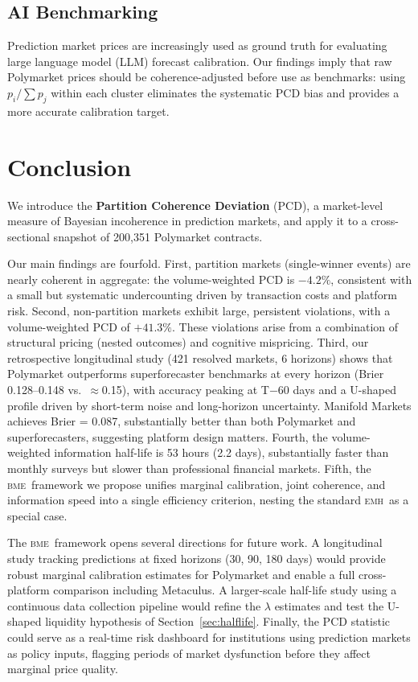 \documentclass[12pt,a4paper]{article}
\theoremstyle{definition}
\theoremstyle{remark}
\newcommand{\PCD}{\mathrm{PCD}}
\newcommand{\EMH}{\textsc{emh}}
\newcommand{\BME}{\textsc{bme}}
\begin{document}
\subsection{AI Benchmarking}

Prediction market prices are increasingly used as ground truth for evaluating
large language model (LLM) forecast calibration.
Our findings imply that raw Polymarket prices should be coherence-adjusted
before use as benchmarks: using $p_i / \sum p_j$ within each cluster
eliminates the systematic $\PCD$ bias and provides a more accurate
calibration target.

\section{Conclusion}
\label{sec:conclusion}

We introduce the \textbf{Partition Coherence Deviation} ($\PCD$), a
market-level measure of Bayesian incoherence in prediction markets, and
apply it to a cross-sectional snapshot of 200{,}351 Polymarket contracts.

Our main findings are fourfold.
First, partition markets (single-winner events) are nearly coherent in
aggregate: the volume-weighted $\PCD$ is $-4.2\%$, consistent with a
small but systematic undercounting driven by transaction costs and platform
risk.
Second, non-partition markets exhibit large, persistent violations,
with a volume-weighted $\PCD$ of $+41.3\%$.
These violations arise from a combination of structural pricing (nested
outcomes) and cognitive mispricing.
Third, our retrospective longitudinal study (421 resolved markets, 6 horizons)
shows that Polymarket outperforms superforecaster benchmarks at every horizon
(Brier 0.128--0.148 vs.\ $\approx$0.15), with accuracy peaking at T$-$60 days
and a U-shaped profile driven by short-term noise and long-horizon uncertainty.
Manifold Markets achieves Brier = 0.087, substantially better than both
Polymarket and superforecasters, suggesting platform design matters.
Fourth, the volume-weighted information half-life is 53 hours (2.2 days),
substantially faster than monthly surveys but slower than professional
financial markets.
Fifth, the \BME\ framework we propose unifies marginal calibration,
joint coherence, and information speed into a single efficiency criterion,
nesting the standard \EMH\ as a special case.

The \BME\ framework opens several directions for future work.
A longitudinal study tracking predictions at fixed horizons (30, 90, 180
days) would provide robust marginal calibration estimates for Polymarket
and enable a full cross-platform comparison including Metaculus.
A larger-scale half-life study using a continuous data collection pipeline
would refine the $\lambda$ estimates and test the U-shaped liquidity
hypothesis of Section~\ref{sec:halflife}.
Finally, the $\PCD$ statistic could serve as a real-time risk dashboard for
institutions using prediction markets as policy inputs, flagging periods
of market dysfunction before they affect marginal price quality.
\end{document}
